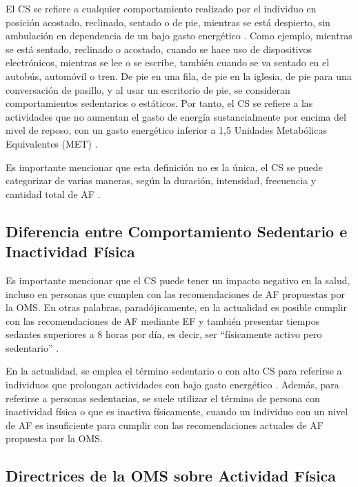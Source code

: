 El CS se refiere a cualquier comportamiento realizado por el individuo en posición acostado, reclinado, sentado o de pie, mientras se está despierto, sin ambulación en dependencia de un bajo gasto energético \citep{Tremblay2017Terminology}. Como ejemplo, mientras se está sentado, reclinado o acostado, cuando se hace uso de dispositivos electrónicos, mientras se lee o se escribe, también cuando se va sentado en el autobús, automóvil o tren. De pie en una fila, de pie en la iglesia, de pie para una conversación de pasillo, y al usar un escritorio de pie, se consideran comportamientos sedentarios o estáticos. Por tanto, el CS se refiere a las actividades que no aumentan el gasto de energía sustancialmente por encima del nivel de reposo, con un gasto energético inferior a 1,5 Unidades Metabólicas Equivalentes (MET) \citep{Pate2008Evolving,Alvarez2020EnergyExpenditure}.

Es importante mencionar que esta definición no es la única, el CS se puede categorizar de varias maneras, según la duración, intensidad, frecuencia y cantidad total de AF \citep{Tremblay2017Terminology}.

\subsection{Diferencia entre Comportamiento Sedentario e Inactividad Física}
\label{subsec:diferencia_cs_inactividad}

Es importante mencionar que el CS puede tener un impacto negativo en la salud, incluso en personas que cumplen con las recomendaciones de AF propuestas por la OMS. En otras palabras, paradójicamente, en la actualidad es posible cumplir con las recomendaciones de AF mediante EF y también presentar tiempos sedantes superiores a 8 horas por día, es decir, ser ``físicamente activo pero sedentario'' \citep{Reyes2023Actividad}.

En la actualidad, se emplea el término sedentario o con alto CS para referirse a individuos que prolongan actividades con bajo gasto energético \citep{Tremblay2017Terminology}. Además, para referirse a personas sedentarias, se suele utilizar el término de persona con inactividad física o que es inactiva físicamente, cuando un individuo con un nivel de AF es insuficiente para cumplir con las recomendaciones actuales de AF propuesta por la OMS.

\subsection{Directrices de la OMS sobre Actividad Física}
\label{subsec:directrices_oms}

